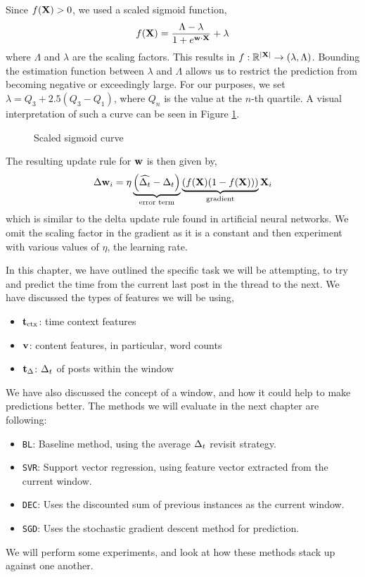 Since $f(\mathbf{X}) > 0$, we used a scaled sigmoid function,
\[
	f(\mathbf{X}) = \frac{\Lambda-\lambda}{1 + e^{\mathbf{w} \cdot \mathbf{X}}} + \lambda
\]
where $\Lambda$ and $\lambda$ are the scaling factors. This results in $f: 
\mathbb{R}^{|\mathbf{X}|}  \rightarrow (\lambda,\Lambda)$. Bounding the estimation 
function between $\lambda$ and $\Lambda$ allows us to restrict the prediction 
from becoming negative or exceedingly large. For our purposes, we set 
$\lambda = Q_3 + 2.5(Q_{3} - Q_{1})$, where $Q_n$ is the value at the $n$-th 
quartile. A visual interpretation of such a curve can be seen in Figure 
\ref{fig:scaled_sigmoid}.
\begin{figure}
\begin{center}
\end{center}
\caption{Scaled sigmoid curve}\label{fig:scaled_sigmoid}
\end{figure}

The resulting update rule for $\mathbf{w}$ is then given by,
\[
	\Delta \mathbf{w}_i = \eta
				\underbrace{\left(\widehat{\Delta_t} - \Delta_t \right)}_{\text{error term}}
				\underbrace{\left( f(\mathbf{X})(1-f(\mathbf{X})) \right)}_{\text{gradient}}
						\mathbf{X}_i
\]
which is similar to the delta update rule found in artificial neural networks.  
We omit the scaling factor in the gradient as it is a constant and then 
experiment with various values of $\eta$, the learning rate. 

In this chapter, we have outlined the specific task we will be attempting, to 
try and predict the time from the current last post in the thread to the next.
We have discussed the types of features we will be using,
\begin{itemize}
	\item $\mathbf{t}_\text{ctx}$: time context features
	\item $\mathbf{v}$: content features, in particular, word counts
	\item $\mathbf{t}_\Delta$: $\Delta_t$ of posts within the window
\end{itemize}
We have also discussed the concept of a window, and how it could help to make 
predictions better. The methods we will evaluate in the next chapter are 
following:
\begin{itemize}
	\item \texttt{BL}: Baseline method, using the average $\Delta_t$ revisit 
strategy.
	\item \texttt{SVR}: Support vector regression, using feature vector 
extracted from the current window.
	\item \texttt{DEC}: Uses the discounted sum of previous instances as the 
current window.
	\item \texttt{SGD}: Uses the stochastic gradient descent method for 
prediction.
\end{itemize}
We will perform some experiments, and look at how these methods stack up against 
one another.

